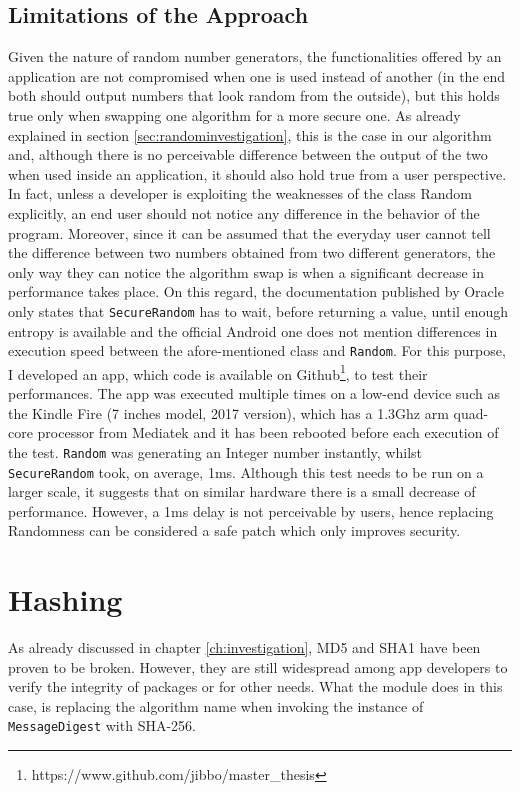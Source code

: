 \subsection{Limitations of the Approach}
Given the nature of random number generators, the functionalities offered by an application are not compromised when one is used instead of another (in the end both should output numbers that look random from the outside), but this holds true only when swapping one algorithm for a more secure one. As already explained in section \ref{sec:randominvestigation}, this is the case in our algorithm and, although there is no perceivable difference between the output of the two when used inside an application, it should also hold true from a user perspective. In fact, unless a developer is exploiting the weaknesses of the class Random explicitly, an end user should not notice any difference in the behavior of the program. Moreover, since it can be assumed that the everyday user cannot tell the difference between two numbers obtained from two different generators, the only way they can notice the algorithm swap is when a significant decrease in performance takes place. On this regard, the documentation published by Oracle only states that \texttt{SecureRandom} has to wait, before returning a value, until enough entropy is available and the official Android one does not mention differences in execution speed between the afore-mentioned class and \texttt{Random}. For this purpose, I developed an app, which code is available on Github\footnote{https://www.github.com/jibbo/master\_thesis}, to test their performances. The app was executed multiple times on a low-end device such as the Kindle Fire (7 inches model, 2017 version), which has a 1.3Ghz arm quad-core processor from Mediatek and it has been rebooted before each execution of the test. \texttt{Random} was generating an Integer number instantly, whilst \texttt{SecureRandom} took, on average, 1ms. Although this test needs to be run on a larger scale, it suggests that on similar hardware there is a small decrease of performance. However, a 1ms delay is not perceivable by users, hence replacing Randomness can be considered a safe patch which only improves security.

\section{Hashing}
As already discussed in chapter \ref{ch:investigation}, MD5 and SHA1 have been proven to be broken. However, they are still widespread among app developers to verify the integrity of packages or for other needs. What the module does in this case, is replacing the algorithm name when invoking the instance of \texttt{MessageDigest} with SHA-256.

